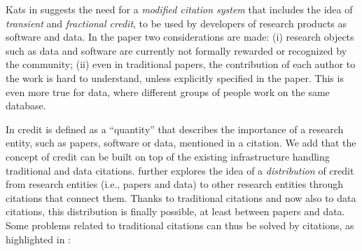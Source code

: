 Kats in \citep{transitiveCreditKatz2014} suggests the need for a \emph{modified citation system} that includes the idea of \emph{transient} and \emph{fractional credit}, to be used by developers of research products as software and data.
In the paper two considerations are made: (i) research objects such as data and software are currently not formally rewarded or recognized by the community; 
(ii) even in traditional papers, the contribution of each author to the work is hard to understand, unless explicitly specified in the paper. 
This is even more true for data, where different groups of people work on the same database.

In \citep{transitiveCreditKatz2014} credit is defined as a ``quantity'' that describes the importance of a research entity, such as papers, software or data, mentioned in a citation. 
We add that the concept of credit can be built on top of the existing infrastructure handling traditional and data citations.
\citep{transitiveCreditKatz2014} further explores the idea of a \emph{distribution} of credit from research entities (i.e., papers and data) to other research entities through citations that connect them. 
Thanks to traditional citations and now also to data citations, this distribution is finally possible, at least between papers and data. 
Some problems related to traditional citations can thus be solved by citations, as highlighted in \citep{transitiveCreditKatz2014}:

